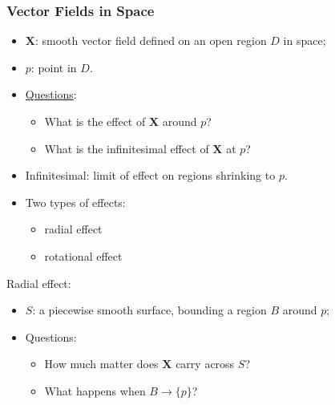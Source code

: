 \begin{frame}
  \frametitle{Vector Fields in Space}

  \begin{itemize}
    \item $\textbf{X}$: smooth vector field defined on an open region $D$ in space;
    \item $p$: point in $D$.
    \item \underline{Questions}:
    \begin{itemize}
      \item What is the effect of $\textbf{X}$ around $p$?
      \item What is the infinitesimal effect of $\textbf{X}$ at $p$?
    \end{itemize}
    \item Infinitesimal: limit of effect on regions shrinking to $p$.
    \item \pause Two types of effects:
    \begin{itemize}
      \item radial effect
      \item rotational effect
    \end{itemize}
  \end{itemize}

  \pause Radial effect:
  \begin{itemize}
    \item $S$: a piecewise smooth surface, bounding a region $B$ around $p$;
    \item Questions:
    \begin{itemize}
      \item How much matter does $\textbf{X}$ carry across $S$?
      \item What happens when $B \to \{p\}$?
    \end{itemize}
  \end{itemize}
\end{frame}


